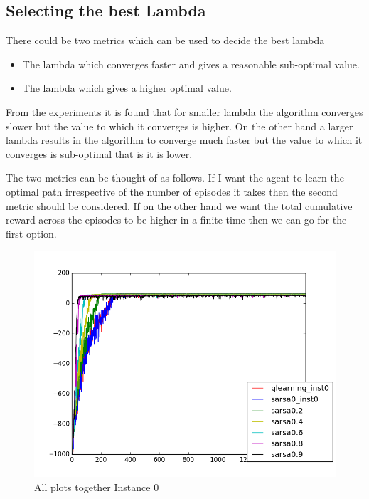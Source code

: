 \documentclass{article}
\begin{document}
\subsection{Selecting the best Lambda}
There could be two metrics  which can be used to decide the best lambda
\begin{itemize}
\item The lambda which converges faster and gives a reasonable sub-optimal value.
\item The lambda which gives a higher optimal value.
\end{itemize}
From the experiments it is found that for smaller lambda the algorithm converges slower but the value to which it converges is higher. On the other hand a larger lambda results in the algorithm to converge much faster but the value to which it converges is sub-optimal that is it is lower.

The two metrics can be thought of as follows. If I want the agent to learn the optimal path irrespective of the number of episodes it takes then the second metric should be considered. If on the other hand we want the total cumulative reward across the episodes to be higher in a finite time then we can go for the first option.

\begin{figure}[H]
  \centering
  \includegraphics[scale=0.5]{images/all_instance_0}
  \caption{All plots together Instance 0}
  \label{fig:allinst0}
\end{figure}
\end{document}
